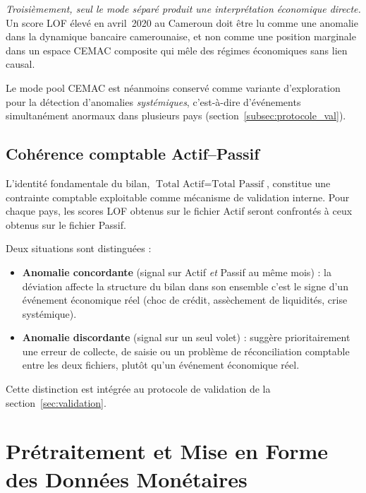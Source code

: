 \documentclass[12pt, a4paper]{article}
\begin{document}
\textit{Troisièmement, seul le mode séparé produit une interprétation
économique directe.}
Un score LOF élevé en avril~2020 au Cameroun doit être lu comme une anomalie
dans la dynamique bancaire camerounaise, et non comme une position marginale
dans un espace CEMAC composite qui mêle des régimes économiques sans lien
causal.

Le mode pool CEMAC est néanmoins conservé comme variante d'exploration pour
la détection d'anomalies \textit{systémiques}, c'est-à-dire d'événements
simultanément anormaux dans plusieurs pays
(section~\ref{subsec:protocole_val}).

\subsection{Cohérence comptable Actif--Passif}
\label{subsec:actif_passif}

L'identité fondamentale du bilan, $\text{Total Actif} = \text{Total Passif}$,
constitue une contrainte comptable exploitable comme mécanisme de validation
interne. Pour chaque pays, les scores LOF obtenus sur le fichier Actif seront
confrontés à ceux obtenus sur le fichier Passif.

Deux situations sont distinguées :
\begin{itemize}
    \item \textbf{Anomalie concordante} (signal sur Actif \textit{et} Passif
    au même mois) : la déviation affecte la structure du bilan dans son
    ensemble  c'est le signe d'un événement économique réel (choc de
    crédit, assèchement de liquidités, crise systémique).
    \item \textbf{Anomalie discordante} (signal sur un seul volet) :
    suggère prioritairement une erreur de collecte, de saisie ou un problème
    de réconciliation comptable entre les deux fichiers, plutôt qu'un
    événement économique réel.
\end{itemize}

Cette distinction est intégrée au protocole de validation de la
section~\ref{sec:validation}.

\section{Prétraitement et Mise en Forme des Données Monétaires}
\label{sec:pretraitement}
\end{document}
